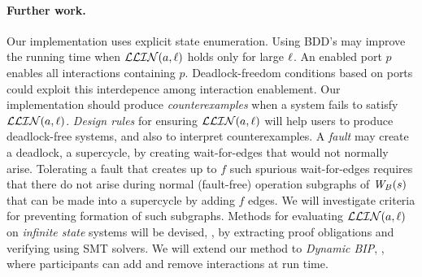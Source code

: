 \paragraph{Further work.} 
Our implementation uses explicit state enumeration. %
Using BDD's may improve the running time 
when $\mathcal{LLIN}(a, \ell)$ holds only for large $\ell$.
%
An enabled port $p$ enables all interactions containing $p$.
Deadlock-freedom conditions based on ports could exploit
this interdepence among interaction enablement.
%
Our implementation should produce \emph{counterexamples} when a system
fails to satisfy $\mathcal{LLIN}(a, \ell)$.
%
\emph{Design rules} for ensuring $\mathcal{LLIN}(a, \ell)$ will help users to
produce deadlock-free systems, and also to interpret counterexamples.
%
A \emph{fault} may create a deadlock,  \ie a supercycle, by creating 
wait-for-edges that would not normally arise.
Tolerating a fault that creates up to $f$ such spurious wait-for-edges 
requires that there do not arise during normal
(fault-free) operation subgraphs of $\mathit{W}_{B}({s})$ that can be made into a
supercycle by adding $f$ edges. 
We will investigate criteria for preventing formation of such subgraphs.
%
Methods for evaluating $\mathcal{LLIN}(a, \ell)$ on \emph{infinite state} systems will be
devised, \eg, by extracting proof obligations and verifying using SMT solvers.
%
We will extend our method to \emph{Dynamic BIP},
\cite{DBLP:conf/soco/BozgaJMS12}, where participants can add and remove
interactions at run time.


